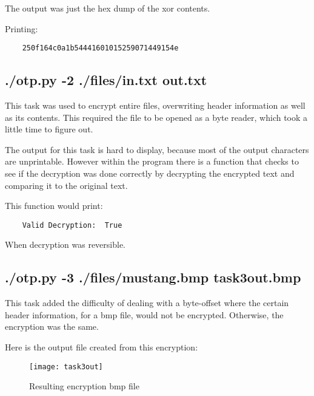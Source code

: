 \documentclass[12pt]{exam}
\begin{document}
    The output was just the hex dump of the xor contents. 
    \bigskip
    
Printing: 
\begin{verbatim}
    250f164c0a1b54441601015259071449154e
\end{verbatim}
    

\subsection{./otp.py -2 ./files/in.txt out.txt}

    \bigskip

This task was used to encrypt entire files, overwriting header information as
well as its contents. This required the file to be opened as a byte reader,
which took a little time to figure out.

    \bigskip
    \bigskip
    
    \bigskip

The output for this task is hard to display, because most of the output
characters are unprintable. However within the program there is a function that
checks to see if the decryption was done correctly by decrypting the encrypted
text and comparing it to the original text.

This function would print:

\begin{verbatim}
    Valid Decryption:  True
\end{verbatim}

When decryption was reversible.



\subsection{./otp.py -3 ./files/mustang.bmp task3out.bmp}

\bigskip

This task added the difficulty of dealing with a byte-offset where the certain header
information, for a bmp file, would not be encrypted. Otherwise, the encryption was the same.

    \bigskip
    \bigskip
    
    \bigskip

    Here is the output file created from this encryption:

    \begin{figure}[H]
        \centering
        \texttt{[image: task3out]}
        \caption{Resulting encryption bmp file}
        \label{fig:task3}
    \end{figure}
\end{document}
